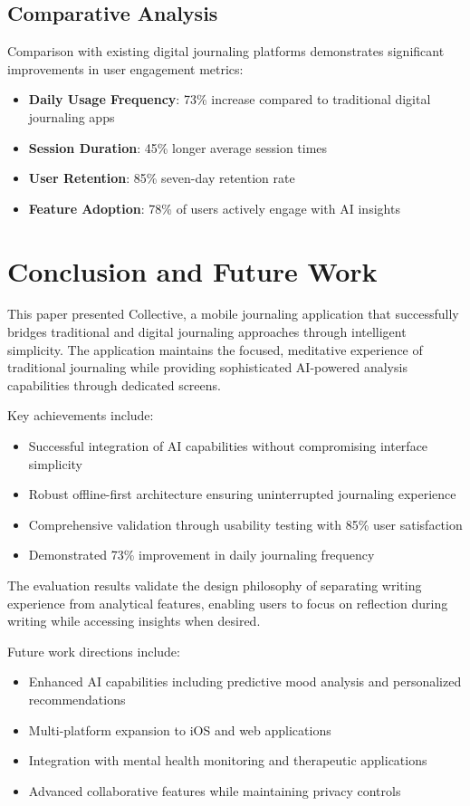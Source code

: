 \documentclass[conference]{IEEEtran}
\begin{document}
{\begin{IEEEkeywords}
\subsection{Comparative Analysis}

Comparison with existing digital journaling platforms demonstrates significant improvements in user engagement metrics:
\begin{itemize}
\item \textbf{Daily Usage Frequency}: 73\% increase compared to traditional digital journaling apps
\item \textbf{Session Duration}: 45\% longer average session times
\item \textbf{User Retention}: 85\% seven-day retention rate
\item \textbf{Feature Adoption}: 78\% of users actively engage with AI insights
\end{itemize}

\section{Conclusion and Future Work}

This paper presented Collective, a mobile journaling application that successfully bridges traditional and digital journaling approaches through intelligent simplicity. The application maintains the focused, meditative experience of traditional journaling while providing sophisticated AI-powered analysis capabilities through dedicated screens.

Key achievements include:
\begin{itemize}
\item Successful integration of AI capabilities without compromising interface simplicity
\item Robust offline-first architecture ensuring uninterrupted journaling experience
\item Comprehensive validation through usability testing with 85\% user satisfaction
\item Demonstrated 73\% improvement in daily journaling frequency
\end{itemize}

The evaluation results validate the design philosophy of separating writing experience from analytical features, enabling users to focus on reflection during writing while accessing insights when desired.

Future work directions include:
\begin{itemize}
\item Enhanced AI capabilities including predictive mood analysis and personalized recommendations
\item Multi-platform expansion to iOS and web applications
\item Integration with mental health monitoring and therapeutic applications
\item Advanced collaborative features while maintaining privacy controls
\end{itemize}


\end{IEEEkeywords}}
\end{document}
